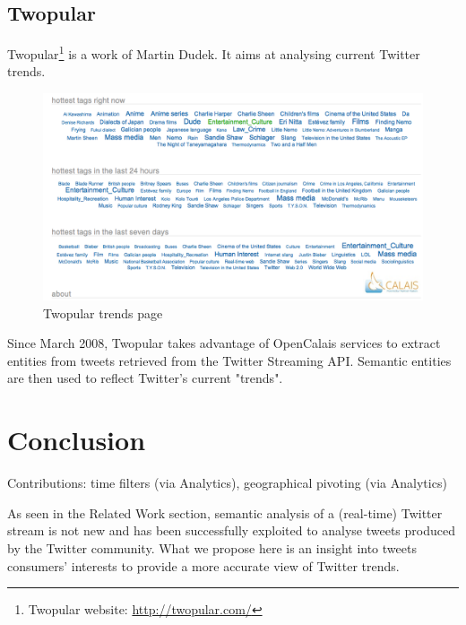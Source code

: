 \documentclass[runningheads,a4paper]{llncs}
\begin{document}
\subsection{Twopular}

Twopular\footnote{Twopular website: \url{http://twopular.com/}} is a work of Martin Dudek. It aims at analysing current Twitter trends.

\begin{figure}[h!]
  \centering
  \includegraphics[width=0.85\linewidth]{twopular-trends.png}
  \caption{Twopular trends page}
  \label{fig:dataflow}
\end{figure}

Since March 2008, Twopular takes advantage of OpenCalais services to extract entities from tweets retrieved from the Twitter Streaming API. \linebreak
Semantic entities are then used to reflect Twitter's current "trends".

\section{Conclusion}
Contributions: time filters (via Analytics), geographical pivoting (via Analytics)

As seen in the Related Work section, semantic analysis of a (real-time) Twitter stream is not new and has been successfully exploited to analyse tweets produced by the Twitter community.
What we propose here is an insight into tweets consumers' interests to provide a more accurate view of Twitter trends.




\end{document}
